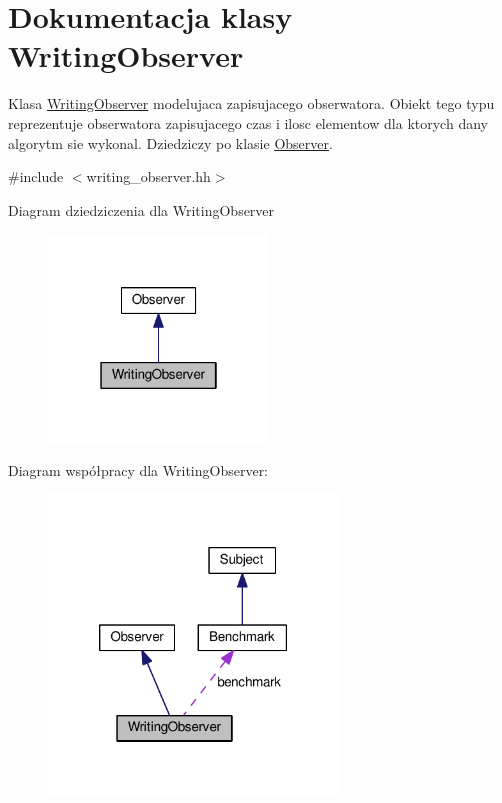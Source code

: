 \hypertarget{class_writing_observer}{\section{Dokumentacja klasy Writing\-Observer}
\label{class_writing_observer}
}


Klasa \hyperlink{class_writing_observer}{Writing\-Observer} modelujaca zapisujacego obserwatora. Obiekt tego typu reprezentuje obserwatora zapisujacego czas i ilosc elementow dla ktorych dany algorytm sie wykonal. Dziedziczy po klasie \hyperlink{class_observer}{Observer}.  




{\ttfamily \#include $<$writing\-\_\-observer.\-hh$>$}



Diagram dziedziczenia dla Writing\-Observer
\nopagebreak
\begin{figure}[H]
\begin{center}
\leavevmode
\includegraphics[width=166pt]{class_writing_observer__inherit__graph}
\end{center}
\end{figure}


Diagram współpracy dla Writing\-Observer\-:
\nopagebreak
\begin{figure}[H]
\begin{center}
\leavevmode
\includegraphics[width=219pt]{class_writing_observer__coll__graph}
\end{center}
\end{figure}
